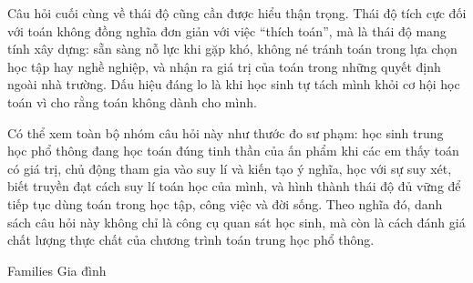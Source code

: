 {{    Câu hỏi cuối cùng về thái độ cũng cần được hiểu thận trọng. Thái độ tích cực đối với toán không đồng nghĩa đơn giản với việc ``thích toán'', mà là thái độ mang tính xây dựng: sẵn sàng nỗ lực khi gặp khó, không né tránh toán trong lựa chọn học tập hay nghề nghiệp, và nhận ra giá trị của toán trong những quyết định ngoài nhà trường. Dấu hiệu đáng lo là khi học sinh tự tách mình khỏi cơ hội học toán vì cho rằng toán không dành cho mình.

    Có thể xem toàn bộ nhóm câu hỏi này như thước đo sư phạm: học sinh trung học phổ thông đang học toán đúng tinh thần của ấn phẩm khi các em thấy toán có giá trị, chủ động tham gia vào suy lí và kiến tạo ý nghĩa, học với sự suy xét, biết truyền đạt cách suy lí toán học của mình, và hình thành thái độ đủ vững để tiếp tục dùng toán trong học tập, công việc và đời sống. Theo nghĩa đó, danh sách câu hỏi này không chỉ là công cụ quan sát học sinh, mà còn là cách đánh giá chất lượng thực chất của chương trình toán trung học phổ thông.}
  }

\ParallelSection
  {Families}
  {Gia đình}
  {}

